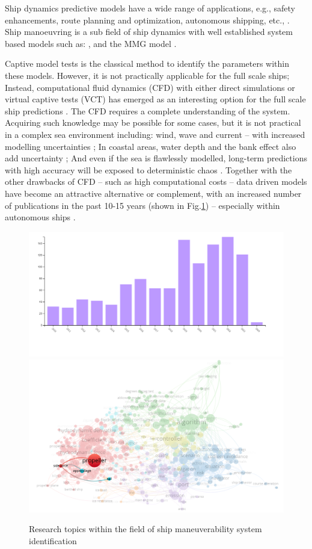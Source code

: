 Ship dynamics predictive models have a wide range of applications, e.g., safety enhancements, route planning and optimization, autonomous shipping, etc., \citep{aslam_internet_2020}.
Ship manoeuvring is a sub field of ship dynamics with well established system based models such as: \citet{abkowitz_ship_1964,nomoto_steering_1957,norrbin_theory_1971}, and the MMG model \citep{yasukawa_introduction_2015}.

Captive model tests is the classical method to identify the parameters within these models. However, it is not practically applicable for the full scale ships; Instead, computational fluid dynamics (CFD) with either direct simulations or virtual captive tests (VCT) has emerged as an interesting option for the full scale ship predictions \citep{liu_predictions_2018,li_ship_2022}.
The CFD requires a complete understanding of the system. Acquiring such knowledge may be possible for some cases, but it is not practical in a complex sea environment including: wind, wave and current -- with increased modelling uncertainties \citep{miller_ship_2021}; In coastal areas, water depth and the bank effect also add uncertainty  \citep{nielsen_machine_2022};
And even if the sea is flawlessly modelled, long-term predictions with high accuracy will be exposed to deterministic chaos \citep{lorenz_deterministic_1963}.
Together with the other drawbacks of CFD -- such as high computational costs -- data driven models have become an attractive alternative or complement, with an increased number of publications in the past 10-15 years (shown in Fig.\ref{fig:pub_overview}) -- especially within autonomous ships \citep{ahmed_survey_2023}.
%
\begin{figure}[h]
  \includegraphics[width=.5\textwidth]{figures/trendinyear.jpg}
  \includegraphics[width=.5\textwidth]{figures/wind_drift_research.png}
  \caption{Research topics within the field of ship maneuverability system identification}
  \label{fig:pub_overview}
\end{figure}
%

